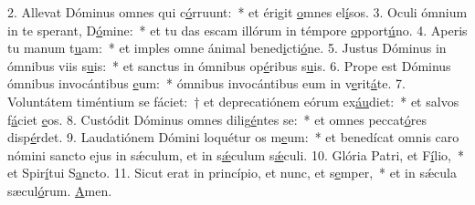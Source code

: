 2. Allevat Dóminus omnes qui c\uline{ó}rruunt:~* et érigit \uline{o}mnes el\uline{í}sos.
3. Oculi ómnium in te sperant, D\uline{ó}mine:~* et tu das escam illórum in témpore \uline{o}pport\uline{ú}no.
4. Aperis tu manum t\uline{u}am:~* et imples omne ánimal bened\uline{i}cti\uline{ó}ne.
5. Justus Dóminus in ómnibus viis s\uline{u}is:~* et sanctus in ómnibus op\uline{é}ribus s\uline{u}is.
6. Prope est Dóminus ómnibus invocántibus \uline{e}um:~* ómnibus invocántibus eum in v\uline{e}rit\uline{á}te.
7. Voluntátem timéntium se fáciet:~† et deprecatiónem eórum ex\uline{áu}diet:~* et salvos f\uline{á}ciet \uline{e}os.
8. Custódit Dóminus omnes dilig\uline{é}ntes se:~* et omnes peccat\uline{ó}res disp\uline{é}rdet.
9. Laudatiónem Dómini loquétur os m\uline{e}um:~* et benedícat omnis caro nómini sancto ejus in sǽculum, et in s\uline{ǽ}culum s\uline{ǽ}culi.
10. Glória Patri, et F\uline{í}lio,~* et Spir\uline{í}tui S\uline{a}ncto.
11. Sicut erat in princípio, et nunc, et s\uline{e}mper,~* et in sǽcula sæcul\uline{ó}rum. \uline{A}men.
